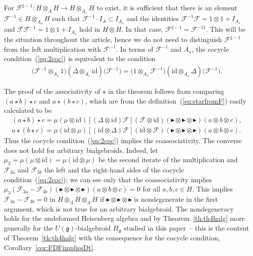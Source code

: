 \documentclass[10pt,a4paper]{amsart}
\def\gg{\mathfrak{g}}
\def\id{\mathrm{id}}
\numberwithin{equation}{section}
\begin{document}
\begin{Remark} \label{rem:invcoc}
For $\mathcal{F}^{\sharp -1}\colon H\otimes_{A} H\to H\otimes_{A_\star}H$ to exist, it is sufficient that there is an element $\mathcal{F}^{-1}\in H\otimes_{A_\star} H$ such that $\mathcal{F}^{-1}\cdot I_A \subset I_{A_\star}$ and the identities $\mathcal{F}^{-1}\mathcal{F} = 1\otimes 1 + I_{A_\star}$ and $\mathcal{F}\mathcal{F}^{-1} = 1\otimes 1 + I_{A_\star}$ hold in $H\otimes H$. In that case, $\mathcal{F}^{\sharp -1} = \mathcal{F}^{-1 \sharp}$. This will be the situation throughout the article, hence
we do not need to distinguish $\mathcal{F}^{\sharp -1}$ from the left multiplication with $\mathcal{F}^{-1}$.
In terms of $\mathcal{F}^{-1}$ and $A_\star$,
the cocycle condition~(\ref{eq:2coc}) is equivalent to the condition
\begin{gather*}
\big(\mathcal{F}^{-1}\otimes_{A_\star} 1\big)(\Delta\otimes_{A_\star}\mathrm{id})\big(\mathcal{F}^{-1}\big)
= \big(1\otimes_{A_\star}\mathcal{F}^{-1}\big)(\mathrm{id}\otimes_{A_\star}\Delta)\big(\mathcal{F}^{-1}\big).
\end{gather*}
\end{Remark}

\begin{Remark}\label{rem:cocyccoass} The proof of the associativity of $\star$ in the theorem follows from comparing $(a\star b)\star c$ and $a\star(b\star c)$, which are from the definition~(\ref{eq:starfromF}) easily calculated to be
\begin{gather*}
(a\star b) \star c = \mu(\mu\otimes\id)[(\Delta\otimes\id)\mathcal{F}](\mathcal{F}\otimes\id)(\blacktriangleright\otimes\blacktriangleright\otimes\blacktriangleright)(a\otimes b\otimes c),
\\
a\star (b \star c) = \mu(\id\otimes\mu)[(\id\otimes\Delta)\mathcal{F}](\id\otimes \mathcal{F})(\blacktriangleright\otimes\blacktriangleright\otimes\blacktriangleright)(a\otimes b\otimes c).
\end{gather*}
Thus the cocycle condition~(\ref{eq:2coc}) implies the coassociativity. The converse does not hold for arbitrary bialgebroids. Indeed, let $\mu_2 = \mu(\mu\otimes\id) = \mu(\id\otimes\mu)$ be the second iterate of the multiplication and $\mathcal{F}_{3a}$ and $\mathcal{F}_{3b}$ the left and the right-hand sides of the cocycle condition~(\ref{eq:2coc}); we can see only that the coassociativity implies $\mu_3(\mathcal{F}_{3a}-\mathcal{F}_{3b})(\blacktriangleright\otimes \blacktriangleright\otimes\blacktriangleright)(a\otimes b\otimes c) = 0$
for all $a,b,c\in H$. This implies $\mathcal{F}_{3a}-\mathcal{F}_{3b} = 0$ in $H\otimes_A H\otimes_A H$ if $\blacktriangleright\otimes\blacktriangleright \otimes\blacktriangleright$ is nondegenerate in the first argument, which is not true for
an arbitrary bialgebroid. The nondegeneracy holds for the undeformed Heisenberg algebra and by Theorem~\ref{th:th4halg} more generally for the $U(\gg)$-bialgebroid $H_\gg$ studied in this paper~-- this is the content of Theorem~\ref{th:th4halg} with the consequence for the cocycle condition, Corollary~\ref{cor:FDFimpliesDt}.
\end{Remark}
\end{document}
